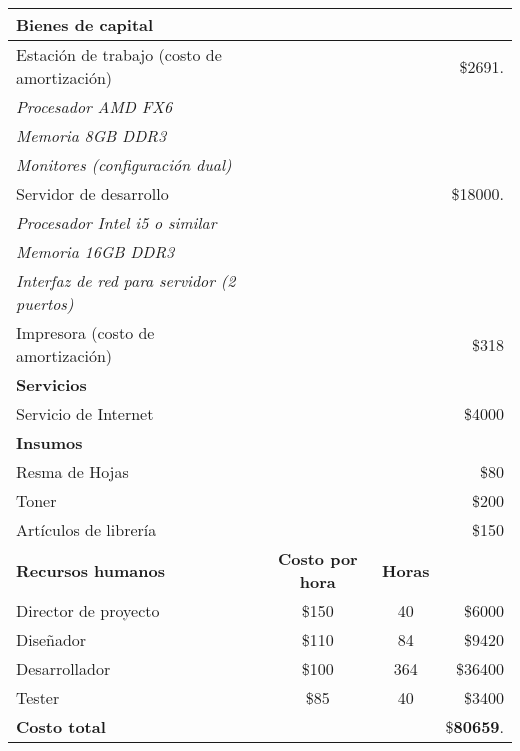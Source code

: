\begin{center}

	\begin{tabular}{l c c r}
		\hline \hline
		
		\textbf{Bienes de capital} & & & \\ \hline
		Estación de trabajo (costo de amortización)& & & \$2691. \\
		\textit{Procesador AMD FX6} & & &\\
		\textit{Memoria 8GB DDR3} & & & \\
		\textit{Monitores (configuración dual)} & & & \\
		\hline
		Servidor de desarrollo & & & \$18000. \\
		\textit{Procesador Intel i5 o similar} & & & \\
		\textit{Memoria 16GB DDR3} & & & \\
		\textit{Interfaz de red para servidor (2 puertos)} & & & \\
		\hline
		Impresora (costo de amortización) & & & \$318 \\
		\hline \hline
		
		\textbf{Servicios} & & &\\ \hline
		Servicio de Internet & & & \$4000 \\
		\hline \hline
		\textbf{Insumos} & & &\\ \hline
		Resma de Hojas & & & \$80 \\
		Toner & & & \$200 \\
		Artículos de librería & & & \$150 \\
		\hline \hline
		\textbf{Recursos humanos} & \textbf{Costo por hora} & \textbf{Horas} \\
		Director de proyecto & \$150 & 40 & \$6000 \\
		Diseñador & \$110 & 84 & \$9420 \\
		Desarrollador & \$100 & 364 & \$36400 \\
		Tester & \$85 & 40 & \$3400 \\
		\hline \hline
		\textbf{Costo total} & & & \$\textbf{80659}.
	\end{tabular}
\end{center}



